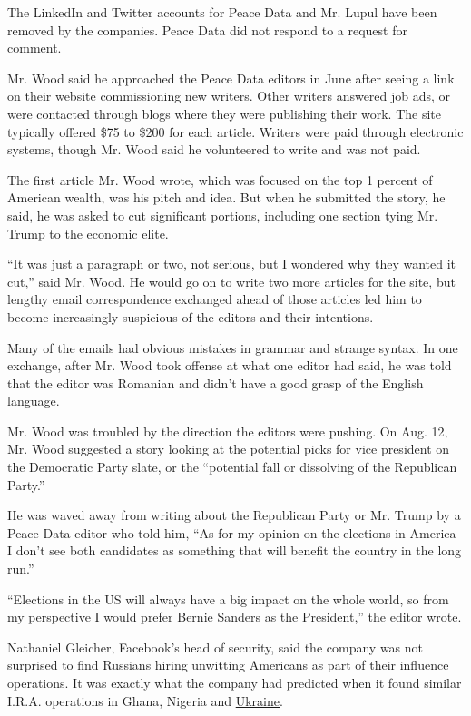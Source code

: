 The LinkedIn and Twitter accounts for Peace Data and Mr. Lupul have been
removed by the companies. Peace Data did not respond to a request for
comment.

Mr. Wood said he approached the Peace Data editors in June after seeing
a link on their website commissioning new writers. Other writers
answered job ads, or were contacted through blogs where they were
publishing their work. The site typically offered \$75 to \$200 for each
article. Writers were paid through electronic systems, though Mr. Wood
said he volunteered to write and was not paid.

The first article Mr. Wood wrote, which was focused on the top 1 percent
of American wealth, was his pitch and idea. But when he submitted the
story, he said, he was asked to cut significant portions, including one
section tying Mr. Trump to the economic elite.

``It was just a paragraph or two, not serious, but I wondered why they
wanted it cut,'' said Mr. Wood. He would go on to write two more
articles for the site, but lengthy email correspondence exchanged ahead
of those articles led him to become increasingly suspicious of the
editors and their intentions.

Many of the emails had obvious mistakes in grammar and strange syntax.
In one exchange, after Mr. Wood took offense at what one editor had
said, he was told that the editor was Romanian and didn't have a good
grasp of the English language.

Mr. Wood was troubled by the direction the editors were pushing. On Aug.
12, Mr. Wood suggested a story looking at the potential picks for vice
president on the Democratic Party slate, or the ``potential fall or
dissolving of the Republican Party.''

He was waved away from writing about the Republican Party or Mr. Trump
by a Peace Data editor who told him, ``As for my opinion on the
elections in America I don't see both candidates as something that will
benefit the country in the long run.''

``Elections in the US will always have a big impact on the whole world,
so from my perspective I would prefer Bernie Sanders as the President,''
the editor wrote.

Nathaniel Gleicher, Facebook's head of security, said the company was
not surprised to find Russians hiring unwitting Americans as part of
their influence operations. It was exactly what the company had
predicted when it found similar I.R.A. operations in Ghana, Nigeria and
\href{https://www.nytimes3xbfgragh.onion/2019/03/29/world/europe/ukraine-russia-election-tampering-propaganda.html}{Ukraine}.

